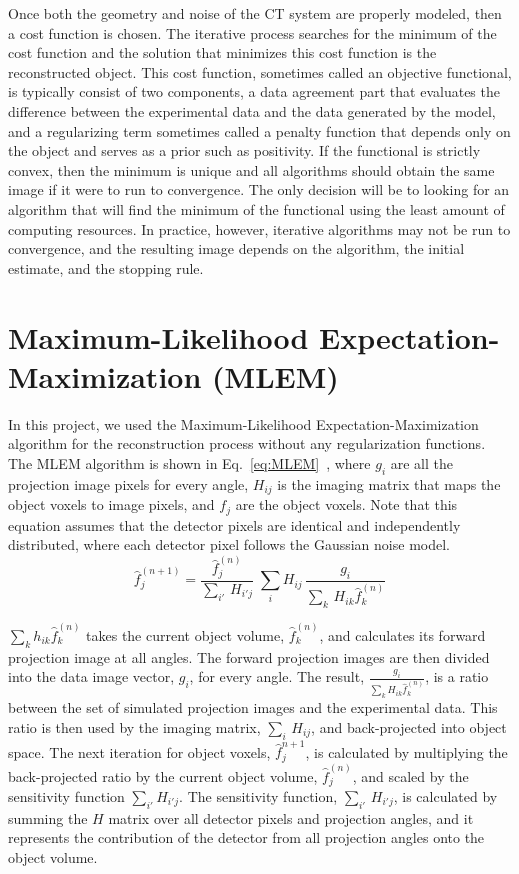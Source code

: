 Once both the geometry and noise of the CT system are properly modeled, then a cost function is chosen.  The iterative process searches for the minimum of the cost function and the solution that minimizes this cost function is the reconstructed object.  This cost function, sometimes called an objective functional, is typically consist of two components, a data agreement part that evaluates the difference between the experimental data and the data generated by the model, and a regularizing term sometimes called a penalty function that depends only on the object and serves as a prior such as positivity.  If the functional is strictly convex, then the minimum is unique and all algorithms should obtain the same image if it were to run to convergence.  The only decision will be to looking for an algorithm that will find the minimum of the functional using the least amount of computing resources.  In practice, however, iterative algorithms may not be run to convergence, and the resulting image depends on the algorithm, the initial estimate, and the stopping rule.

\section{Maximum-Likelihood Expectation-Maximization (MLEM) }
In this project, we used the Maximum-Likelihood Expectation-Maximization algorithm for the reconstruction process without any regularization functions.  The MLEM algorithm is shown in Eq.~\ref{eq:MLEM}~\citep{EmissionTom2004}, where $g_i$ are all the projection image pixels for every angle, $H_{ij}$ is the imaging matrix that maps the object voxels to image pixels, and $f_{j}$ are the object voxels.  Note that this equation assumes that the detector pixels are identical and independently distributed, where each detector pixel follows the Gaussian noise model. 
\begin{equation}
\hat{f}^{(n+1)}_{j} = \frac{\hat{f}^{(n)}_j}{{\sum\limits_{i'}} \, H_{i'j}} \; 
						\sum\limits_{i} H_{ij} \, \frac{g_{i}}{\sum\limits_{k} \, H_{ik} \hat{f}_{k}^{(n)}}
\label{eq:MLEM}
\end{equation}

\noindent $\sum\limits_k h_{ik} \hat{f}_k^{(n)}$ takes the current object volume, $\hat{f}^{(n)}_k$, and calculates its forward projection image at all angles.  The forward projection images are then divided into the data image vector, $g_i$, for every angle.  The result, $\frac{g_i}{\sum\limits_k H_{ik} \hat{f}_k^{(n)}}$, is a ratio between the set of simulated projection images and the experimental data.  This ratio is then used by the imaging matrix, $\sum\limits_i \, H_{ij}$, and back-projected into object space.  The next iteration for object voxels, $\hat{f}_j^{n+1}$, is calculated by multiplying the back-projected ratio by the current object volume, $\hat{f}_j^{(n)}$, and scaled by the sensitivity function $\sum\limits_{i'} H_{i'j}$.  The sensitivity function, $\sum\limits_{i'} \, H_{i' j}$, is calculated by summing the $H$ matrix over all detector pixels and projection angles, and it represents the contribution of the detector from all projection angles onto the object volume.

